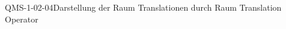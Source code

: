 
\begin{DEF}{QMS-1-02-04}{Darstellung der Raum Translationen durch Raum Translation Operator}
\end{DEF}
